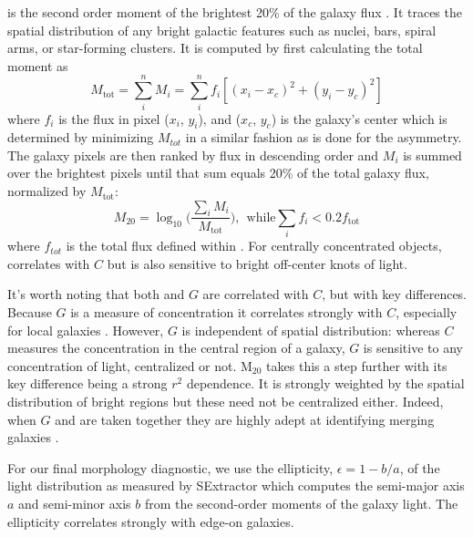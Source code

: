  is the second order moment of the brightest 20\% of the galaxy flux \citep{Lotz2004}. It traces the spatial distribution of any bright galactic features such as nuclei, bars, spiral arms, or star-forming clusters. It is computed by first calculating the total moment as
\begin{equation}
 M_{\mathrm{tot}} = \sum_i^n M_i = \sum_i^nf_i[(x_i-x_c)^2 + (y_i-y_c)^2] 
\end{equation}
where $f_i$ is the flux in pixel ($x_i$, $y_i$), and ($x_c$, $y_c$) is the galaxy's center which is determined by minimizing $M_{tot}$ in a similar fashion as is done for the asymmetry. The galaxy pixels are then ranked by flux in descending order and $M_i$ is summed over the brightest pixels until that sum equals 20\% of the total galaxy flux, normalized by $M_{\mathrm{tot}}$:
\begin{equation}
 M_{20} = \log_{10} \Big( \frac{\sum_iM_i}{M_{\mathrm{tot}}} \Big), ~~\textrm{while} \sum_if_i < 0.2f_{\mathrm{tot}}
\end{equation}
where $f_{tot}$ is the total flux defined within \rp. For centrally concentrated objects,  correlates with $C$ but is also sensitive to bright off-center knots of light. 

It's worth noting that both  and $G$ are correlated with $C$, but with key differences. Because $G$ is a measure of concentration it correlates strongly with $C$, especially for local galaxies \citep{Abraham2003}. However, $G$ is independent of spatial distribution: whereas $C$ measures the concentration in the central region of a galaxy, $G$ is sensitive to any concentration of light, centralized or not. M$_{20}$ takes this a step further with its key difference being a strong $r^2$ dependence. It is strongly weighted by the spatial distribution of bright regions but these need not be centralized either.  Indeed, when $G$ and  are taken together they are highly adept at identifying merging galaxies \citep{Lotz2004,Lotz2008}.  


For our final morphology diagnostic, we use the ellipticity, $\epsilon = 1 - b/a$, of the light distribution as measured by SExtractor which computes the semi-major axis $a$ and semi-minor axis $b$ from the second-order moments of the galaxy light. The ellipticity correlates strongly with edge-on galaxies. 

